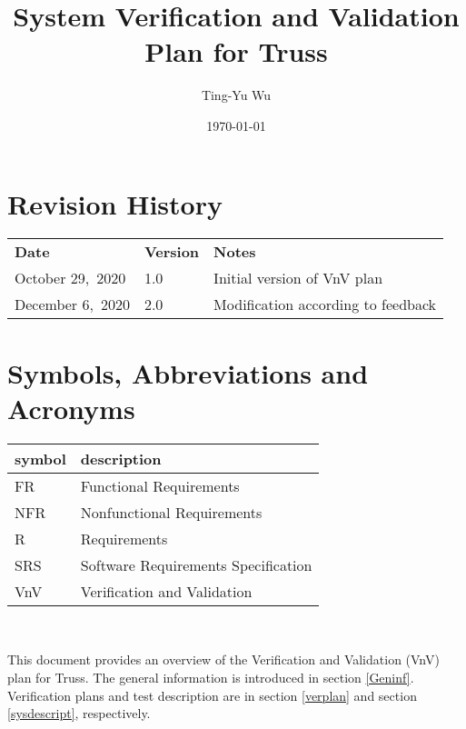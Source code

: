 \documentclass[12pt, titlepage]{article}
\begin{document}
\title{System Verification and Validation Plan for Truss} 
\author{Ting-Yu Wu}
\date{\today}
	
\maketitle


\section{Revision History}

\begin{tabularx}{\textwidth}{p{3.5cm}p{2cm}X}
\toprule {\bf Date} & {\bf Version} & {\bf Notes}\\
October 29,~2020 & 1.0 & Initial version of VnV plan\\
December 6,~2020 & 2.0 & Modification according to feedback\\
\bottomrule
\end{tabularx}

\newpage

\tableofcontents

\listoftables

\newpage

\section{Symbols, Abbreviations and Acronyms}

\renewcommand{\arraystretch}{1.2}
\begin{tabular}{l l} 
  \toprule		
  \textbf{symbol} & \textbf{description}\\
  \midrule 
  FR & Functional Requirements\\
  NFR & Nonfunctional Requirements\\
  R & Requirements\\
  SRS & Software Requirements Specification\\
  VnV & Verification and Validation\\
  \bottomrule
\end{tabular}\\


\newpage


This document provides an overview of the Verification and Validation (VnV) 
plan for Truss. The general information is introduced in section \ref{Geninf}. 
Verification plans and test description are in section \ref{verplan} and 
section \ref{sysdescript}, respectively.
\end{document}
